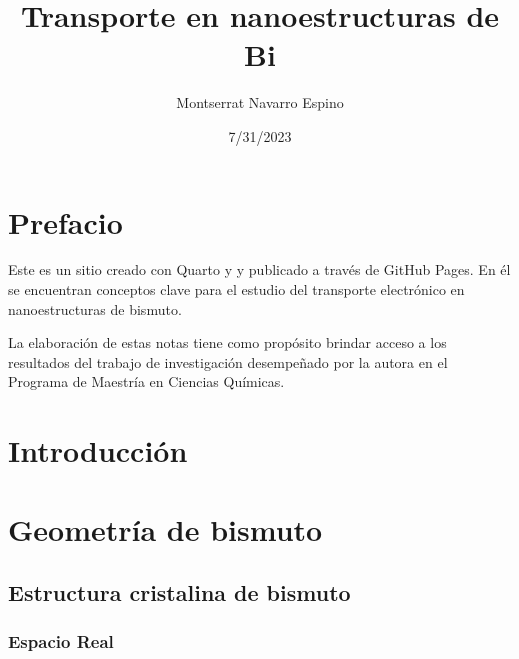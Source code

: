 \documentclass[
  letterpaper,
  DIV=11,
  numbers=noendperiod]{scrreprt}
\title{Transporte en nanoestructuras de Bi}
\author{Montserrat Navarro Espino}
\date{7/31/2023}
\renewcommand*\contentsname{Table of contents}
\newcommand\contentsname{Table of contents}
\begin{document}
\maketitle
\ifdefined\Shaded\renewenvironment{Shaded}{\begin{tcolorbox}[breakable, borderline west={3pt}{0pt}{shadecolor}, interior hidden, boxrule=0pt, enhanced, sharp corners, frame hidden]}{\end{tcolorbox}}\fi

\renewcommand*\contentsname{Table of contents}
{
\hypersetup{linkcolor=}
\setcounter{tocdepth}{2}
\tableofcontents
}

\hypertarget{prefacio}{%
\chapter*{Prefacio}\label{prefacio}}

Este es un sitio creado con Quarto y y publicado a través de GitHub
Pages. En él se encuentran conceptos clave para el estudio del
transporte electrónico en nanoestructuras de bismuto.

La elaboración de estas notas tiene como propósito brindar acceso a los
resultados del trabajo de investigación desempeñado por la autora en el
Programa de Maestría en Ciencias Químicas.


\hypertarget{introducciuxf3n}{%
\chapter{Introducción}\label{introducciuxf3n}}


\hypertarget{geometruxeda-de-bismuto}{%
\chapter{Geometría de bismuto}\label{geometruxeda-de-bismuto}}

\hypertarget{estructura-cristalina-de-bismuto}{%
\section{Estructura cristalina de
bismuto}\label{estructura-cristalina-de-bismuto}}

\hypertarget{espacio-real}{%
\subsection{Espacio Real}\label{espacio-real}}
\end{document}
